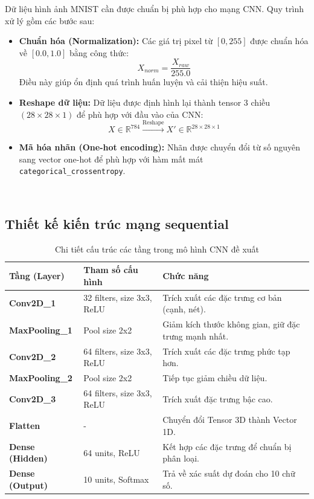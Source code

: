 \documentclass[../DoAn.tex]{subfiles}
\begin{document}
Dữ liệu hình ảnh MNIST cần được chuẩn bị phù hợp cho mạng CNN. Quy trình xử lý gồm các bước sau:

\begin{itemize}
    \item \textbf{Chuẩn hóa (Normalization):} Các giá trị pixel từ $[0, 255]$ được chuẩn hóa về $[0.0, 1.0]$ bằng công thức:
    \begin{equation}
        X_{norm} = \frac{X_{raw}}{255.0}
    \end{equation}
    Điều này giúp ổn định quá trình huấn luyện và cải thiện hiệu suất.
    
    \item \textbf{Reshape dữ liệu:} Dữ liệu được định hình lại thành tensor 3 chiều $(28 \times 28 \times 1)$ để phù hợp với đầu vào của CNN:
    \begin{equation}
        X \in \mathbb{R}^{784} \xrightarrow{\text{Reshape}} X' \in \mathbb{R}^{28 \times 28 \times 1}
    \end{equation}
    
    \item \textbf{Mã hóa nhãn (One-hot encoding):} Nhãn được chuyển đổi từ số nguyên sang vector one-hot để phù hợp với hàm mất mát \texttt{categorical\_crossentropy}.
\end{itemize}
\\
\subsection{Thiết kế kiến trúc mạng sequential}

\begin{table}[H]
\centering
\small %
\caption{Chi tiết cấu trúc các tầng trong mô hình CNN đề xuất}
\begin{tabularx}{\textwidth}{|l|l|X|} %
\hline
\textbf{Tầng (Layer)} & \textbf{Tham số cấu hình} & \textbf{Chức năng} \\ \hline
\textbf{Conv2D\_1} & 32 filters, size 3x3, ReLU & Trích xuất các đặc trưng cơ bản (cạnh, nét). \\ \hline
\textbf{MaxPooling\_1} & Pool size 2x2 & Giảm kích thước không gian, giữ đặc trưng mạnh nhất. \\ \hline
\textbf{Conv2D\_2} & 64 filters, size 3x3, ReLU & Trích xuất các đặc trưng phức tạp hơn. \\ \hline
\textbf{MaxPooling\_2} & Pool size 2x2 & Tiếp tục giảm chiều dữ liệu. \\ \hline
\textbf{Conv2D\_3} & 64 filters, size 3x3, ReLU & Trích xuất đặc trưng bậc cao. \\ \hline
\textbf{Flatten} & \centering - & Chuyển đổi Tensor 3D thành Vector 1D. \\ \hline
\textbf{Dense (Hidden)} & 64 units, ReLU & Kết hợp các đặc trưng để chuẩn bị phân loại. \\ \hline
\textbf{Dense (Output)} & 10 units, Softmax & Trả về xác suất dự đoán cho 10 chữ số. \\ \hline
\end{tabularx}
\end{table}
\\
\end{document}
